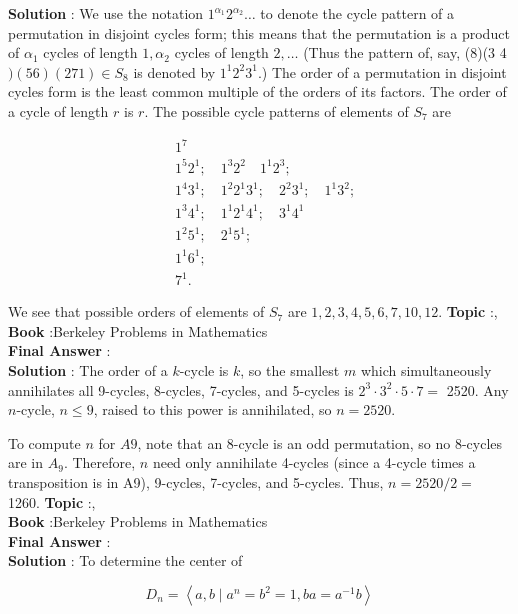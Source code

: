 \documentclass[10pt]{article}
\begin{document}
\textbf{Solution} : We use the notation $1^{\alpha_{1}} 2^{\alpha_{2}} \ldots$ to denote the cycle pattern of a permutation in disjoint cycles form; this means that the permutation is a product of $\alpha_{1}$ cycles of length $1, \alpha_{2}$ cycles of length $2, \ldots$ (Thus the pattern of, say, (8)(3 4$)(56)(271) \in S_{8}$ is denoted by $1^{1} 2^{2} 3^{1}$.) The order of a permutation in disjoint cycles form is the least common multiple of the orders of its factors. The order of a cycle of length $r$ is $r$. The possible cycle patterns of elements of $S_{7}$ are

$$
\begin{aligned}
& 1^{7} \\
& 1^{5} 2^{1} ; \quad 1^{3} 2^{2} \quad 1^{1} 2^{3} ; \\
& 1^{4} 3^{1} ; \quad 1^{2} 2^{1} 3^{1} ; \quad 2^{2} 3^{1} ; \quad 1^{1} 3^{2} ; \\
& 1^{3} 4^{1} ; \quad 1^{1} 2^{1} 4^{1} ; \quad 3^{1} 4^{1} \\
& 1^{2} 5^{1} ; \quad 2^{1} 5^{1} \text {; } \\
& 1^{1} 6^{1} \text {; } \\
& 7^{1} \text {. }
\end{aligned}
$$

We see that possible orders of elements of $S_{7}$ are $1,2,3,4,5,6,7,10,12$.
\textbf{Topic} :, \\
\textbf{Book} :Berkeley Problems in Mathematics\\
\textbf{Final Answer} :\\


\textbf{Solution} : The order of a $k$-cycle is $k$, so the smallest $m$ which simultaneously annihilates all 9-cycles, 8-cycles, 7-cycles, and 5-cycles is $2^{3} \cdot 3^{2} \cdot 5 \cdot 7=$ 2520. Any $n$-cycle, $n \leqslant 9$, raised to this power is annihilated, so $n=2520$.

To compute $n$ for $A 9$, note that an 8-cycle is an odd permutation, so no 8-cycles are in $A_{9}$. Therefore, $n$ need only annihilate 4-cycles (since a 4-cycle times a transposition is in A9), 9-cycles, 7-cycles, and 5-cycles. Thus, $n=2520 / 2=$ 1260.
\textbf{Topic} :, \\
\textbf{Book} :Berkeley Problems in Mathematics\\
\textbf{Final Answer} :\\


\textbf{Solution} : To determine the center of

$$
D_{n}=\left\langle a, b \mid a^{n}=b^{2}=1, b a=a^{-1} b\right\rangle
$$
\end{document}
